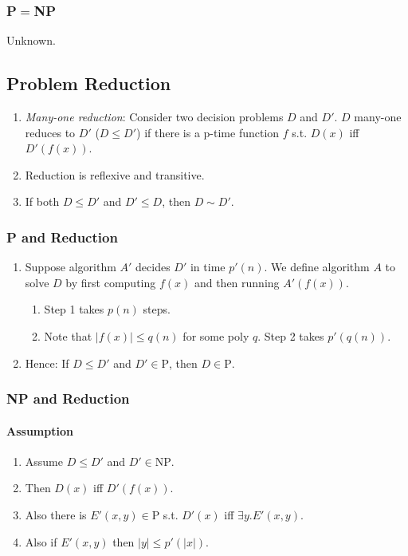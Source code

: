\documentclass[twocolumn,english]{article}
\begin{document}
\subsubsection{P$\boldsymbol{=}$NP}

Unknown.


\subsection{Problem Reduction}
\begin{enumerate}
\item \emph{Many-one reduction}: Consider two decision problems $D$ and
$D'$. $D$ many-one reduces to $D'$ ($D\leq D'$) if there is a
p-time function $f$ s.t. $D\left(x\right)$ iff $D'\left(f\left(x\right)\right)$.
\item Reduction is reflexive and transitive.
\item If both $D\leq D'$ and $D'\leq D$, then $D\sim D'$.
\end{enumerate}

\subsubsection{P and Reduction}
\begin{enumerate}
\item Suppose algorithm $A'$ decides $D'$ in time $p'\left(n\right)$.
We define algorithm $A$ to solve $D$ by first computing $f\left(x\right)$
and then running $A'\left(f\left(x\right)\right)$.

\begin{enumerate}
\item Step 1 takes $p\left(n\right)$ steps.
\item Note that $\left|f\left(x\right)\right|\leq q\left(n\right)$ for
some poly $q$. Step 2 takes $p'\left(q\left(n\right)\right)$.
\end{enumerate}
\item Hence: If $D\leq D'$ and $D'\in\mbox{P}$, then $D\in\mbox{P}$.
\end{enumerate}

\subsubsection{NP and Reduction}


\paragraph{Assumption}
\begin{enumerate}
\item Assume $D\leq D'$ and $D'\in\mbox{NP}$.
\item Then $D\left(x\right)$ iff $D'\left(f\left(x\right)\right)$.
\item Also there is $E'\left(x,y\right)\in\mbox{P}$ s.t. $D'\left(x\right)$
iff $\exists y.E'\left(x,y\right)$.
\item Also if $E'\left(x,y\right)$ then $\left|y\right|\leq p'\left(\left|x\right|\right)$.
\end{enumerate}
\end{document}
